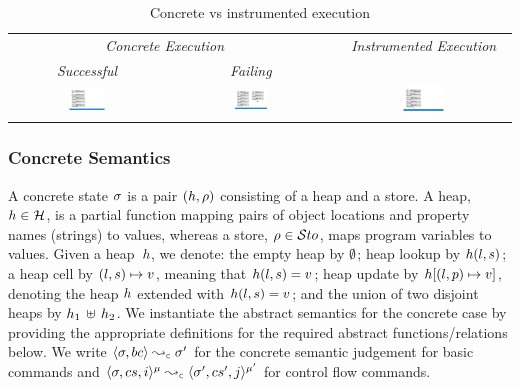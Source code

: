 \begin{table}
\centering
\renewcommand{\arraystretch}{1.2} 
{\scriptsize \begin{tabular}{@{}ccccc@{}}\toprule
\multicolumn{3}{c}{{\it Concrete Execution}} & &  \emph{Instrumented Execution}  \\
\cmidrule{1-3} \cmidrule{5-5}
\emph{Successful}  &  & \emph{Failing}  &   &       \\
\cmidrule{1-1} \cmidrule{3-3}   
{\includegraphics[width=0.25\textwidth]{figures/conc_exec.pdf}} & & 
{\includegraphics[width=0.25\textwidth]{figures/conc_wrong_exec.pdf}}  & & 
{\includegraphics[width=0.25\textwidth]{figures/inst_exec.pdf}}  \\  
\bottomrule
\end{tabular}}
\vspace{2pt}
\caption{Concrete vs instrumented execution\label{example:symb:states:vs:assertions}}
\vspace*{-1cm}
\end{table}

\vspace{-5pt}
\subsubsection{Concrete Semantics}
A \jsil concrete state $\sigma$ is a pair $(h, \rho)$ consisting of a heap and a store. 
A heap, $h \in {\mathcal H}$, is a partial function mapping pairs of  object locations and property names (strings) to values,
whereas a store, $\rho \in \mathcal{S}to$, maps program variables to values. 
Given a heap~$h$, we denote: the empty heap by $\emptyset$; heap lookup by $h(l, s)$; 
a heap cell by $(l, s) \mapsto v$, meaning that  $h(l,s) = v$; 
heap update by $h[(l, p) \mapsto v]$, denoting the heap $h$ extended with $h(l,s) = v$;
and the union of two disjoint heaps by $h_1 \, \uplus \, h_2$.
We instantiate the abstract semantics for the concrete case by providing the appropriate definitions 
for the required abstract functions/relations below.
We write $\absbsemrule{\jstate, \bcmd}{\jstate'}{\concrete}$ for the concrete semantic 
judgement for basic commands and $\abssemrule{\jstate, \cs, i}{\jstate', \cs', j}{\mode}{\mode'}{\concrete}$ 
for control flow commands. 

